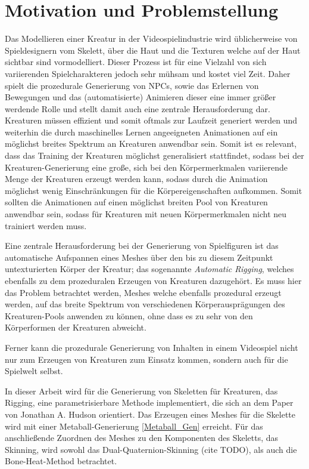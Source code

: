 \section{Motivation und Problemstellung}

Das Modellieren einer Kreatur in der Videospielindustrie wird üblicherweise von Spieldesignern vom Skelett, über die Haut und die Texturen welche auf der Haut sichtbar sind vormodelliert. Dieser Prozess ist für eine Vielzahl von sich variierenden Spielcharakteren jedoch sehr mühsam und kostet viel Zeit. Daher spielt die prozedurale Generierung von NPCs, sowie das Erlernen von Bewegungen und das (automatisierte) Animieren dieser eine immer größer werdende Rolle und stellt damit auch eine zentrale Herausforderung dar. Kreaturen müssen effizient und somit oftmals zur Laufzeit generiert werden und weiterhin die durch maschinelles Lernen angeeigneten Animationen auf ein möglichst breites Spektrum an Kreaturen anwendbar sein. Somit ist es relevant, dass das Training der Kreaturen möglichst generalisiert stattfindet, sodass bei der Kreaturen-Generierung eine große, sich bei den Körpermerkmalen variierende Menge der Kreaturen erzeugt werden kann, sodass durch die Animation möglichst wenig Einschränkungen für die Körpereigenschaften aufkommen. Somit sollten die Animationen auf einen möglichst breiten Pool von Kreaturen anwendbar sein, sodass für Kreaturen mit neuen Körpermerkmalen nicht neu trainiert werden muss.

Eine zentrale Herausforderung bei der Generierung von Spielfiguren ist das automatische Aufspannen eines Meshes über den bis zu diesem Zeitpunkt untexturierten Körper der Kreatur; das sogenannte \textit{Automatic Rigging}, welches ebenfalls zu dem prozeduralen Erzeugen von Kreaturen dazugehört. Es muss hier das Problem betrachtet werden, Meshes welche ebenfalls prozedural erzeugt werden, auf das breite Spektrum von verschiedenen Körperausprägungen des Kreaturen-Pools anwenden zu können, ohne dass es zu sehr von den Körperformen der Kreaturen abweicht.

Ferner kann die prozedurale Generierung von Inhalten in einem Videospiel nicht nur zum Erzeugen von Kreaturen zum Einsatz kommen, sondern auch für die Spielwelt selbst. 

In dieser Arbeit wird für die Generierung von Skeletten für Kreaturen, das Rigging, eine parametrisierbare Methode implementiert, die sich an dem Paper \cite{Hudson2013CreatureGU} von Jonathan A. Hudson orientiert. Das Erzeugen eines Meshes für die Skelette wird mit einer Metaball-Generierung \ref{Metaball_Gen} erreicht. Für das anschließende Zuordnen des Meshes zu den Komponenten des Skeletts, das Skinning, wird sowohl das Dual-Quaternion-Skinning (cite TODO), als auch die Bone-Heat-Method \cite{bone_heat_paper} betrachtet. 

